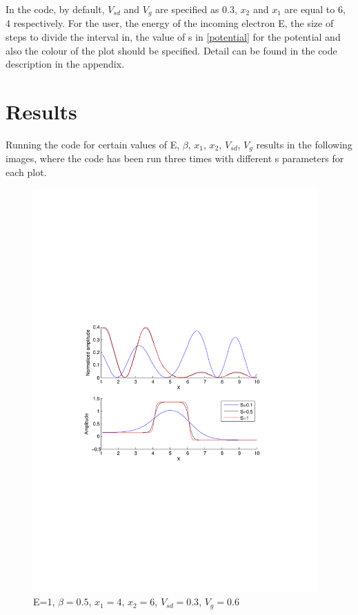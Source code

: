 \documentclass[a4paper]{article}
\begin{document}
In the code, by default, $V_{sd}$ and $V_g$ are specified as $0.3$, $x_2$ and $x_1$ are equal to 6, 4 respectively.
For the user, the energy of the incoming electron E, the size of steps to divide the interval in, the value of s in \eqref{potential} for the potential and also the colour of the plot should be specified. Detail can be found in the code description in the appendix.

\section{Results}
Running the code for certain values of E, $\beta$, $x_1$, $x_2$, $V_{sd}$, $V_g$ results in the following images, where the code has been run three times with different s parameters for each plot.
\begin{figure}[h!]
\centering
\includegraphics[width=4.3in]{test}
\caption{E=1, $\beta=0.5$, $x_1=4$, $x_2=6$, $V_{sd}=0.3$, $V_g=0.6$}
\label{fig:test}
\end{figure}
\newpage
\end{document}
